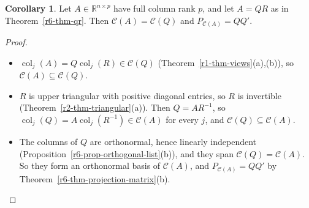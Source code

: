 \documentclass[12pt]{article}
\newcommand{\R}{\mathbb R}
\DeclareMathOperator{\col}{col}
\theoremstyle{definition}
\newtheorem{corollary}[theorem]{Corollary}
\begin{document}
\begin{corollary}\label{r6-cor-qr-projection}
Let \(A\in\R^{n\times p}\) have full column rank \(p\), and let \(A=QR\) as in Theorem~\ref{r6-thm-qr}. Then
\(\mathcal C(A)=\mathcal C(Q)\) and \(P_{\mathcal C(A)}=QQ'\).
\end{corollary}
\begin{proof}
\begin{itemize}
\item \(\col_j(A)=Q\col_j(R)\in\mathcal C(Q)\) (Theorem~\ref{r1-thm-views}(a),(b)), so \(\mathcal C(A)\subseteq\mathcal C(Q)\).
\item \(R\) is upper triangular with positive diagonal entries, so \(R\) is invertible
(Theorem~\ref{r2-thm-triangular}(a)). Then \(Q=AR^{-1}\), so \(\col_j(Q)=A\col_j(R^{-1})\in\mathcal C(A)\) for every \(j\),
and \(\mathcal C(Q)\subseteq\mathcal C(A)\).
\item The columns of \(Q\) are orthonormal, hence linearly independent
(Proposition~\ref{r6-prop-orthogonal-list}(b)), and they span \(\mathcal C(Q)=\mathcal C(A)\). So they form an
orthonormal basis of \(\mathcal C(A)\), and \(P_{\mathcal C(A)}=QQ'\) by
Theorem~\ref{r6-thm-projection-matrix}(b).\qedhere
\end{itemize}
\end{proof}
\end{document}
